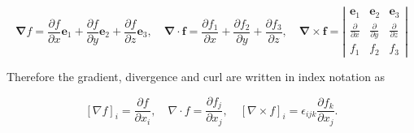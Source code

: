 \begin{definition}
  \[
\boldsymbol{\nabla} f=\frac{\partial f}{\partial x} \boldsymbol{e}_1+\frac{\partial f}{\partial y} \boldsymbol{e}_2+\frac{\partial f}{\partial z} \boldsymbol{e}_3, \quad \boldsymbol{\nabla} \cdot \boldsymbol{f}=\frac{\partial f_1}{\partial x}+\frac{\partial f_2}{\partial y}+\frac{\partial f_3}{\partial z}, \quad \boldsymbol{\nabla} \times \boldsymbol{f}=\left|\begin{array}{ccc}
\boldsymbol{e}_1 & \boldsymbol{e}_2 & \boldsymbol{e}_3 \\
\frac{\partial}{\partial x} & \frac{\partial}{\partial y} & \frac{\partial}{\partial z} \\
f_1 & f_2 & f_3
\end{array}\right|
\]

Therefore the gradient, divergence and curl are written in index notation as

\[
[\nabla f]_i=\frac{\partial f}{\partial x_i}, \quad \nabla \cdot f=\frac{\partial f_j}{\partial x_j}, \quad[\nabla \times f]_i=\epsilon_{i j k} \frac{\partial f_k}{\partial x_j} .
\]
\end{definition}

